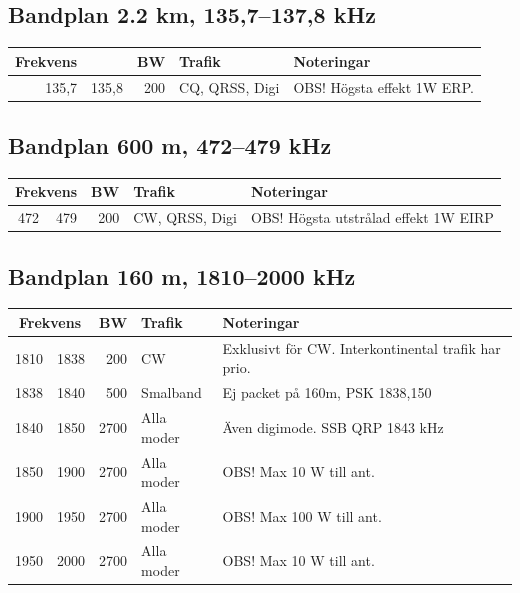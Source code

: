 
\subsection*{Bandplan 2.2 km, 135,7--137,8 kHz}

\begin{tabular}{rrrll}
\textbf{Frekvens} &  & \textbf{BW} & \textbf{Trafik} & \textbf{Noteringar} \\ \hline
135,7 & 135,8 & 200 & CQ, QRSS, Digi & OBS! Högsta effekt 1W ERP. \\ \hline
\end{tabular}

\subsection*{Bandplan 600 m, 472--479 kHz}
\begin{tabular}{rrrll}
\multicolumn{2}{c}{\textbf{Frekvens}} & \textbf{BW} & \textbf{Trafik} & \textbf{Noteringar} \\ \hline
472 & 479 & 200 & CW, QRSS, Digi & OBS! Högsta utstrålad effekt 1W EIRP \\ \hline
\end{tabular}

\subsection*{Bandplan 160 m, 1810--2000 kHz}
\begin{tabular}{rrrll}
\multicolumn{2}{c}{\textbf{Frekvens}} & \textbf{BW} & \textbf{Trafik} & \textbf{Noteringar} \\ \hline
1810 & 1838 & 200  & CW         & Exklusivt för CW. Interkontinental trafik har prio. \\ \hline
1838 & 1840 & 500  & Smalband   & Ej packet på 160m, PSK 1838,150                    \\ \hline
1840 & 1850 & 2700 & Alla moder & Även digimode. SSB QRP 1843 kHz                    \\ \hline
1850 & 1900 & 2700 & Alla moder & OBS! Max 10 W till ant.                             \\ \hline
1900 & 1950 & 2700 & Alla moder & OBS! Max 100 W till ant.                            \\ \hline
1950 & 2000 & 2700 & Alla moder & OBS! Max 10 W till ant.                             \\ \hline
\end{tabular}

